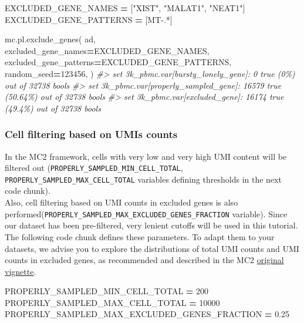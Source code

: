 \documentclass[
]{book}
\newenvironment{Shaded}{\begin{snugshade}}{\end{snugshade}}
\newcommand{\CommentTok}[1]{\textcolor[rgb]{0.56,0.35,0.01}{\textit{#1}}}
\newcommand{\DecValTok}[1]{\textcolor[rgb]{0.00,0.00,0.81}{#1}}
\newcommand{\FloatTok}[1]{\textcolor[rgb]{0.00,0.00,0.81}{#1}}
\newcommand{\NormalTok}[1]{#1}
\newcommand{\OperatorTok}[1]{\textcolor[rgb]{0.81,0.36,0.00}{\textbf{#1}}}
\newcommand{\StringTok}[1]{\textcolor[rgb]{0.31,0.60,0.02}{#1}}
\begin{document}
\begin{Shaded}
\begin{Highlighting}[]
\NormalTok{EXCLUDED\_GENE\_NAMES }\OperatorTok{=}\NormalTok{ [}\StringTok{"XIST"}\NormalTok{, }\StringTok{"MALAT1"}\NormalTok{, }\StringTok{"NEAT1"}\NormalTok{] }
\NormalTok{EXCLUDED\_GENE\_PATTERNS }\OperatorTok{=}\NormalTok{ [}\StringTok{\textquotesingle{}MT{-}.*\textquotesingle{}}\NormalTok{]}

\NormalTok{mc.pl.exclude\_genes(}
\NormalTok{    ad,}
\NormalTok{    excluded\_gene\_names}\OperatorTok{=}\NormalTok{EXCLUDED\_GENE\_NAMES, }
\NormalTok{    excluded\_gene\_patterns}\OperatorTok{=}\NormalTok{EXCLUDED\_GENE\_PATTERNS,}
\NormalTok{    random\_seed}\OperatorTok{=}\DecValTok{123456}\NormalTok{,}
\NormalTok{)}
\CommentTok{\#\textgreater{} set 3k\_pbmc.var[bursty\_lonely\_gene]: 0 true (0\%) out of 32738 bools}
\CommentTok{\#\textgreater{} set 3k\_pbmc.var[properly\_sampled\_gene]: 16579 true (50.64\%) out of 32738 bools}
\CommentTok{\#\textgreater{} set 3k\_pbmc.var[excluded\_gene]: 16174 true (49.4\%) out of 32738 bools}
\end{Highlighting}
\end{Shaded}

\hypertarget{cell-filtering-based-on-umis-counts}{%
\subsubsection*{Cell filtering based on UMIs counts}\label{cell-filtering-based-on-umis-counts}}

In the MC2 framework, cells with very low and very high UMI content will be filtered out (\texttt{PROPERLY\_SAMPLED\_MIN\_CELL\_TOTAL}, \texttt{PROPERLY\_SAMPLED\_MAX\_CELL\_TOTAL} variables defining thresholds in the next code chunk).\\
Also, cell filtering based on UMI counts in excluded genes is also performed(\texttt{PROPERLY\_SAMPLED\_MAX\_EXCLUDED\_GENES\_FRACTION} variable).
Since our dataset has been pre-filtered, very lenient cutoffs will be used in this tutorial.
The following code chunk defines these parameters. To adapt them to your datasets, we advise you to explore the distributions of total UMI counts and UMI counts in excluded genes, as recommended and described in the MC2 \href{https://tanaylab.github.io/metacells-vignettes/one-pass.html}{original vignette}.

\begin{Shaded}
\begin{Highlighting}[]
\NormalTok{PROPERLY\_SAMPLED\_MIN\_CELL\_TOTAL }\OperatorTok{=} \DecValTok{200} 
\NormalTok{PROPERLY\_SAMPLED\_MAX\_CELL\_TOTAL }\OperatorTok{=} \DecValTok{10000} 
\NormalTok{PROPERLY\_SAMPLED\_MAX\_EXCLUDED\_GENES\_FRACTION }\OperatorTok{=} \FloatTok{0.25}
\end{Highlighting}
\end{Shaded}
\end{document}
